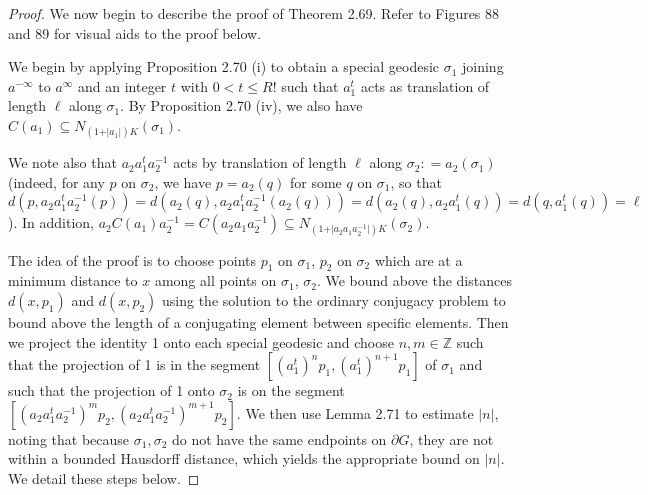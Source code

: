 \documentclass[12pt]{article}
\newcommand{\vs}{\vskip10pt}
\begin{document}
	
	\begin{proof}
		
		We now begin to describe the proof of Theorem 2.69. Refer to Figures 88 and 89 for visual aids to the proof below. 
		
		\vs 
		
		We begin by applying Proposition 2.70 (i) to obtain a special geodesic $\sigma_1$ joining $a^{-\infty}$ to $a^{\infty}$ and an integer $t$ with $0 < t \leq R!$ such that $a_1^t$ acts as translation of length $\ell$ along $\sigma_1$. By Proposition 2.70 (iv), we also have $C(a_1) \subseteq N_{(1 + \vert a_1 \vert)K}(\sigma_1)$. 
		
		\vs 
		
		We note also that $a_2 a_1^t a_2^{-1}$ acts by translation of length $\ell$ along $\sigma_2 : = a_2 (\sigma_1)$ (indeed, for any $p$ on $\sigma_2$, we have $p = a_2 (q)$ for some $q$ on $\sigma_1$, so that $d(p, a_2 a_1^t a_2^{-1}(p) )= d(a_2(q), a_2 a_1^t a_2^{-1}(a_2(q))) = d(a_2(q), a_2 a_1^t (q)) = d(q, a_1^t (q)) = \ell$). In addition, $a_2C(a_1)a_2^{-1} = C(a_2 a_1 a_2^{-1}) \subseteq N_{(1 + \vert a_2 a_1 a_2^{-1}\vert)K}(\sigma_2)$. 
		
		\vs 
		
		The idea of the proof is to choose points $p_1$ on $\sigma_1$, $p_2$ on $\sigma_2$ which are at a minimum distance to $x$ among all points on $\sigma_1$, $\sigma_2$. We bound above the distances $d(x, p_1)$ and $d(x, p_2)$ using the solution to the ordinary conjugacy problem to bound above the length of a conjugating element between specific elements. Then we project the identity 1 onto each special geodesic and choose $n,m \in \mathbb{Z}$ such that the projection of 1 is in the segment $[(a_1^t)^n p_1, (a_1^t)^{n+1} p_1]$ of $\sigma_1$ and such that the projection of 1 onto $\sigma_2$ is on the segment $[(a_2 a_1^t a_2^{-1})^m p_2, (a_2 a_1^t a_2^{-1})^{m+1} p_2]$. We then use Lemma 2.71 to estimate $\vert n \vert$, noting that because $\sigma_1, \sigma_2$ do not have the same endpoints on $\partial G$, they are not within a bounded Hausdorff distance, which yields the appropriate bound on $\vert n \vert$. We detail these steps below.
		
		\vs 
		

\end{proof}
\end{document}
